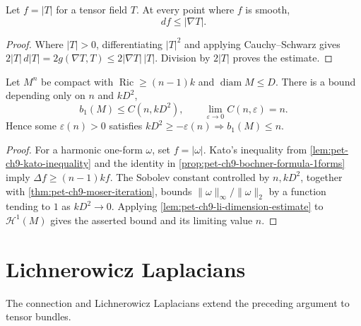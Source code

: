 \begin{lemma}
  \label{lem:pet-ch9-kato-inequality}

  Let $f=|T|$ for a tensor field $T$.  At every point where $f$ is smooth,
  \[
    df\le|\nabla T|.
  \]
\end{lemma}
\begin{proof}
  \sketch
  Where \(|T|>0\), differentiating \(|T|^2\) and applying Cauchy--Schwarz gives
  \(2|T|\,d|T|=2g(\nabla T,T)\le2|\nabla T|\,|T|\).  Division by
  \(2|T|\) proves the estimate.
\end{proof}

\begin{theorem}
  \label{thm:pet-ch9-gromov-gallot-betti1-estimate}

  Let $M^n$ be compact with
  $\operatorname{Ric}\ge(n-1)k$ and $\operatorname{diam}M\le D$.  There is a
  bound depending only on $n$ and $kD^2$,
  \[
    b_1(M)\le C(n,kD^2),
    \qquad \lim_{\varepsilon\to0}C(n,\varepsilon)=n.
  \]
  Hence some $\varepsilon(n)>0$ satisfies
  $kD^2\ge-\varepsilon(n)\Longrightarrow b_1(M)\le n$.
\end{theorem}
\begin{proof}
  \sketch
  For a harmonic one-form \(\omega\), set \(f=|\omega|\).  Kato's inequality
  from \cref{lem:pet-ch9-kato-inequality} and the identity in
  \cref{prop:pet-ch9-bochner-formula-1forms} imply
  \(\Delta f\ge(n-1)kf\).  The Sobolev constant controlled by \(n,kD^2\),
  together with \cref{thm:pet-ch9-moser-iteration}, bounds
  \(\|\omega\|_\infty/\|\omega\|_2\) by a function tending to \(1\) as
  \(kD^2\to0\).  Applying \cref{lem:pet-ch9-li-dimension-estimate} to
  \(\mathcal H^1(M)\) gives the asserted bound and its limiting value \(n\).
\end{proof}

\section{Lichnerowicz Laplacians}

The connection and Lichnerowicz Laplacians extend the preceding argument to
tensor bundles.

